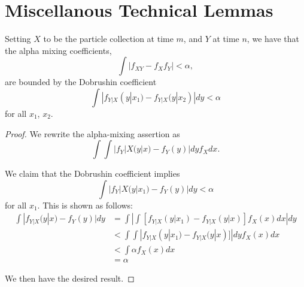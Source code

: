 \documentclass{article}
\begin{document}
\section{Miscellanous Technical Lemmas}


\begin{lem}
    \label{lem:dobrushin-implies-alpha-mixing}
    Setting $X$ to be the particle collection at time $m$, and $Y$ at time $n$, we have that the alpha mixing coefficients,
    $$\int | f_{XY} - f_X f_Y | < \alpha,$$
    are bounded by the Dobrushin coefficient
    $$\int | f_{Y|X}(y|x_1) - f_{Y|X}(y|x_2) |dy < \alpha$$ for all $x_1$, $x_2$.
\end{lem}

\begin{proof}
    We rewrite the alpha-mixing assertion as $$\int { \int |f_Y|X(y|x) - f_Y(y)| dy } f_X dx.$$

    We claim that the Dobrushin coefficient implies $$\int | f_Y|X(y|x_1) - f_Y(y) |dy < \alpha$$ for all $x_1$. This is shown as follows:
    \begin{align*}
        \int | f_{Y|X}(y|x) - f_Y(y) |dy 
        &= \int \left|  \int [f_{Y|X}(y|x_1) - f_{Y|X}(y|x)] f_X(x)dx \right|dy \\
        &< \int   \int  | f_{Y|X}(y|x_1) - f_{Y|X}(y|x)] | dy f_X(x)dx \\
        &< \int \alpha f_X(x)dx \\
        &=\alpha
    \end{align*}
    
    We then have the desired result.
\end{proof}
\end{document}
